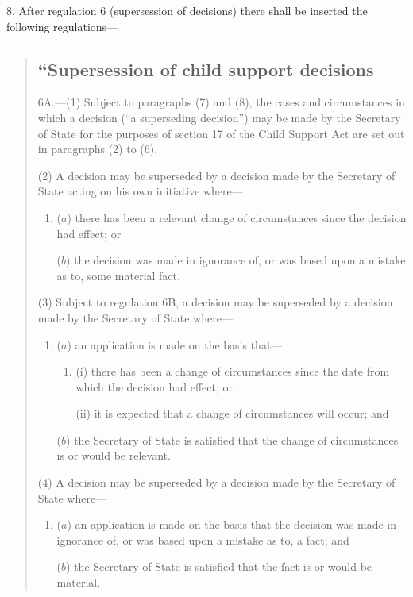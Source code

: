 \documentclass[12pt,a4paper]{article}
\begin{document}
8.  After regulation 6 (supersession of decisions) there shall be inserted the following regulations—
\begin{quotation}
\subsection*{“Supersession of child support decisions}

6A.---(1)  Subject to paragraphs (7) and (8), the cases and circumstances in which a decision (“a superseding decision”) may be made by the Secretary of State for the purposes of section 17 of the Child Support Act are set out in paragraphs (2) to (6).

(2) A decision may be superseded by a decision made by the Secretary of State acting on his own initiative where—
\begin{enumerate}\item[]
($a$) there has been a relevant change of circumstances since the decision had effect; or

($b$) the decision was made in ignorance of, or was based upon a mistake as to, some material fact.
\end{enumerate}

(3) Subject to regulation 6B, a decision may be superseded by a decision made by the Secretary of State where—
\begin{enumerate}\item[]
($a$) an application is made on the basis that—
\begin{enumerate}\item[]
(i) there has been a change of circumstances since the date from which the decision had effect; or

(ii) it is expected that a change of circumstances will occur; and
\end{enumerate}

($b$) the Secretary of State is satisfied that the change of circumstances is or would be relevant.
\end{enumerate}

(4) A decision may be superseded by a decision made by the Secretary of State where—
\begin{enumerate}\item[]
($a$) an application is made on the basis that the decision was made in ignorance of, or was based upon a mistake as to, a fact; and

($b$) the Secretary of State is satisfied that the fact is or would be material.
\end{enumerate}


\end{quotation}
\end{document}

